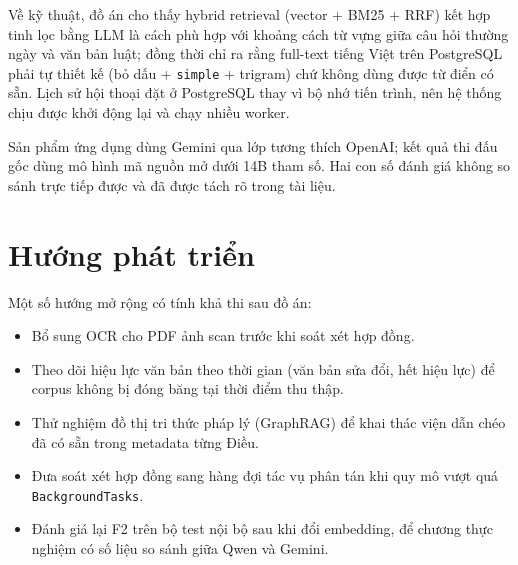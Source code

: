 \documentclass[12pt,a4paper]{report}
\numberwithin{equation}{chapter}
\numberwithin{figure}{chapter}
\numberwithin{table}{chapter}
\begin{document}
Về kỹ thuật, đồ án cho thấy hybrid retrieval (vector + BM25 + RRF) kết hợp tinh
lọc bằng LLM là cách phù hợp với khoảng cách từ vựng giữa câu hỏi thường ngày và
văn bản luật; đồng thời chỉ ra rằng full-text tiếng Việt trên PostgreSQL phải tự
thiết kế (bỏ dấu + \texttt{simple} + trigram) chứ không dùng được từ điển có sẵn.
Lịch sử hội thoại đặt ở PostgreSQL thay vì bộ nhớ tiến trình, nên hệ thống chịu
được khởi động lại và chạy nhiều worker.

Sản phẩm ứng dụng dùng Gemini qua lớp tương thích OpenAI; kết quả thi đấu gốc dùng
mô hình mã nguồn mở dưới 14B tham số. Hai con số đánh giá không so sánh trực tiếp
được và đã được tách rõ trong tài liệu.

\section{Hướng phát triển}

Một số hướng mở rộng có tính khả thi sau đồ án:

\begin{itemize}
    \item Bổ sung OCR cho PDF ảnh scan trước khi soát xét hợp đồng.
    \item Theo dõi hiệu lực văn bản theo thời gian (văn bản sửa đổi, hết hiệu lực)
    để corpus không bị đóng băng tại thời điểm thu thập.
    \item Thử nghiệm đồ thị tri thức pháp lý (GraphRAG) để khai thác viện dẫn chéo
    đã có sẵn trong metadata từng Điều.
    \item Đưa soát xét hợp đồng sang hàng đợi tác vụ phân tán khi quy mô vượt quá
    \texttt{BackgroundTasks}.
    \item Đánh giá lại F2 trên bộ test nội bộ sau khi đổi embedding, để chương
    thực nghiệm có số liệu so sánh giữa Qwen và Gemini.
\end{itemize}
\end{document}
